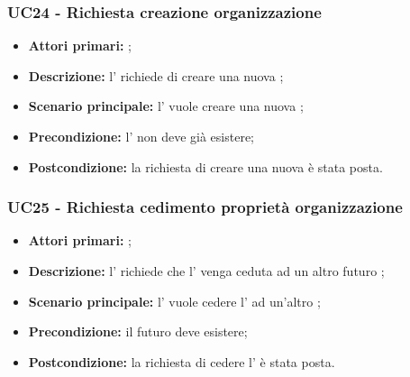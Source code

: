 \documentclass[casi-duso]{subfiles}
\begin{document}
\subsubsection{UC24 - Richiesta creazione organizzazione}
\label{subsub:UC24}

\begin{itemize}
  \item \textbf{Attori primari:} ;
  \item \textbf{Descrizione:} l'  richiede di creare una nuova ;
  \item \textbf{Scenario principale:} l'  vuole creare una nuova ;
  \item \textbf{Precondizione:} l'  non deve già esistere;
  \item \textbf{Postcondizione:} la richiesta di creare una nuova  è stata posta.

\end{itemize}

\subsubsection{UC25 - Richiesta cedimento proprietà organizzazione}
\label{subsub:UC25}

\begin{itemize}
  \item \textbf{Attori primari:} ;
  \item \textbf{\textbf{Descrizione:}} l'  richiede che l' venga ceduta ad un altro futuro ;
  \item \textbf{\textbf{Scenario principale:}} l'  vuole cedere l' ad un'altro ;
  \item \textbf{Precondizione:} il futuro  deve esistere;
  \item \textbf{Postcondizione:} la richiesta di cedere l' è stata posta.

\end{itemize}

\end{document}
